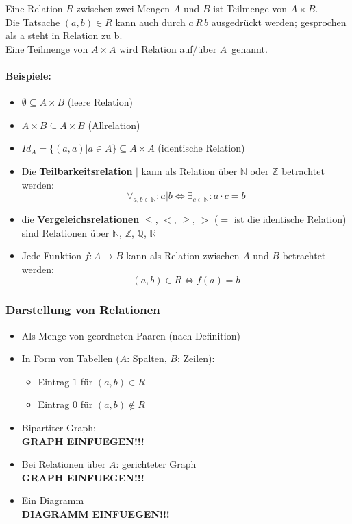 \begin{defi}[Relation]
Eine Relation $R$ zwischen zwei Mengen $A$ und $B$ ist Teilmenge von $A\times B$.\\
Die Tatsache $(a,b)\in R$ kann auch durch $a\,R\,b$ ausgedrückt werden; gesprochen als \glqq a steht in Relation zu b\grqq .\\
Eine Teilmenge von $A\times A$ wird \glqq Relation auf/über $A$\grqq\ genannt.
\end{defi}
%
\paragraph{Beispiele:}
\begin{itemize}
\item $\emptyset \subseteq A\times B$ (leere Relation)
\item $A\times B \subseteq A\times B$ (Allrelation)
\item $Id_A = \{(a,a) | a\in A\} \subseteq A\times A$ (identische Relation)
\item Die \textbf{Teilbarkeitsrelation} $\mid$ kann als Relation über $\mathbb{N}$ oder $\mathbb{Z}$ betrachtet werden:
\[
\forall_{a,b\in\mathbb{N}}: a|b \Leftrightarrow \exists_{c\in\mathbb{N}}: a\cdot c = b
\]
\item die \textbf{Vergeleichsrelationen} $\leq$, $<$, $\geq$, $>$ ($=$ ist die identische Relation) sind Relationen über $\mathbb{N}$, $\mathbb{Z}$, $\mathbb{Q}$, $\mathbb{R}$
\item Jede Funktion $f:A\rightarrow B$ kann als Relation zwischen $A$ und $B$ betrachtet werden:
\[
(a,b)\in R \Leftrightarrow f(a)=b
\]
\end{itemize}

\subsubsection{Darstellung von Relationen}
\begin{itemize}
\item Als Menge von geordneten Paaren (nach Definition)
\item In Form von Tabellen ($A$: Spalten, $B$: Zeilen):
\begin{itemize}
\item Eintrag $1$ für $(a,b)\in R$
\item Eintrag $0$ für $(a,b)\not\in R$
\end{itemize}
\item Bipartiter Graph:\\
\textbf{GRAPH EINFUEGEN!!!}
\item Bei Relationen über $A$: gerichteter Graph\\
\textbf{GRAPH EINFUEGEN!!!}
\item Ein Diagramm\\
\textbf{DIAGRAMM EINFUEGEN!!!}
\end{itemize}

